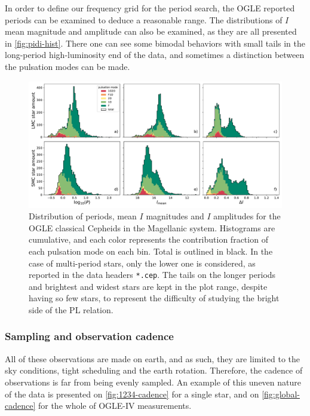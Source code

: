 
In order to define our frequency grid for the period search, the OGLE reported periods can be examined to deduce a reasonable range.
The distributions of $I$ mean magnitude and amplitude can also be examined, as they are all presented in \autoref{fig:pidi-hist}.
There one can see some bimodal behaviors with small tails in the long-period high-luminosity end of the data, 
and sometimes a distinction between the pulsation modes can be made.

\begin{figure}
	\centering
	\includegraphics[width=\textwidth]{img/clouds_histogram_PIdI.pdf}
	\caption[Distribution of signal properties for classical Cepheids in the Magellanic clouds]{
		Distribution of periods, mean $I$ magnitudes and $I$ amplitudes for the OGLE classical Cepheids in the Magellanic system.
		Histograms are cumulative, and each color represents the contribution fraction of each pulsation mode on each bin.
		Total is outlined in black.
		In the case of multi-period stars, only the lower one is considered, as reported in the data headers \texttt{*.cep}.
		The tails on the longer periods and brightest and widest stars are kept in the plot range, despite having so few stars,
		to represent the difficulty of studying the bright side of the PL relation.
	}
	\label{fig:pidi-hist}
\end{figure}


\subsubsection{Sampling and observation cadence \label{sec:sampling}}

All of these observations are made on earth, and as such,
they are limited to the sky conditions, tight scheduling and the earth rotation.
Therefore, the cadence of observations is far from being evenly sampled.
An example of this uneven nature of the data is presented on \autoref{fig:1234-cadence} for a single star,
and on \autoref{fig:global-cadence} for the whole of OGLE-IV measurements.

